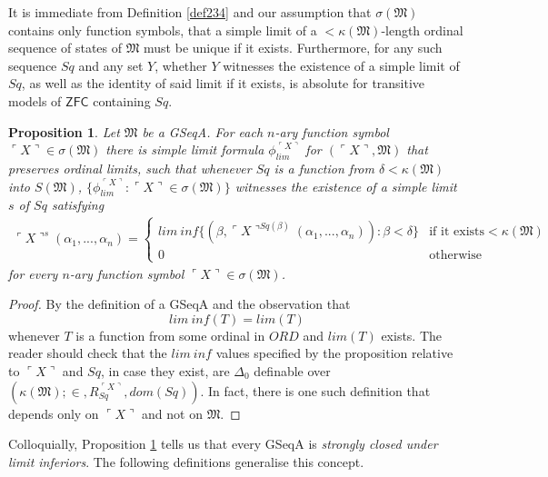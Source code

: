 \documentclass[12pt, twoside]{memoir}
\numberwithin{equation}{section}
\newtheorem{prop}[thm]{Proposition}
\theoremstyle{definition}
\theoremstyle{remark}
\theoremstyle{definition}
\theoremstyle{definition}
\theoremstyle{definition}
\theoremstyle{remark}
\begin{document}
It is immediate from Definition \ref{def234} and our assumption that $\sigma(\mathfrak{M})$ contains only function symbols, that a simple limit of a $< \kappa(\mathfrak{M})$-length ordinal sequence of states of $\mathfrak{M}$ must be unique if it exists. Furthermore, for any such sequence $Sq$ and any set $Y$, whether $Y$ witnesses the existence of a simple limit of $Sq$, as well as the identity of said limit if it exists, is absolute for transitive models of $\mathsf{ZFC}$ containing $Sq$.

\begin{prop}\label{prop233}
Let $\mathfrak{M}$ be a GSeqA. For each $n$-ary function symbol $\ulcorner X \urcorner \in \sigma(\mathfrak{M})$ there is simple limit formula $\phi_{lim}^{\ulcorner X \urcorner}$ for $(\ulcorner X \urcorner, \mathfrak{M})$ that preserves ordinal limits, such that whenever $Sq$ is a function from $\delta < \kappa(\mathfrak{M})$ into $S(\mathfrak{M})$, $\{\phi_{lim}^{\ulcorner X \urcorner} : \ulcorner X \urcorner \in \sigma(\mathfrak{M})\}$ witnesses the existence of a simple limit $s$ of $Sq$ satisfying 
\begin{gather*}
    \ulcorner X \urcorner^{s} (\alpha_1, ..., \alpha_n) = 
    \begin{cases}
        lim \ inf \{(\beta, \ulcorner X \urcorner^{Sq(\beta)}(\alpha_1, ..., \alpha_n)) : \beta < \delta\} & \!\!\!\! \text{if it exists} < \kappa(\mathfrak{M}) \\
        0 & \!\!\!\! \text{otherwise}
    \end{cases} 
\end{gather*}
for every $n$-ary function symbol $\ulcorner X \urcorner \in \sigma(\mathfrak{M})$.
\end{prop}

\begin{proof}
By the definition of a GSeqA and the observation that 
\begin{equation*}
    lim \ inf (T) = lim (T)
\end{equation*}
whenever $T$ is a function from some ordinal in $ORD$ and $lim (T)$ exists. The reader should check that the $lim \ inf$ values specified by the proposition relative to $\ulcorner X \urcorner$ and $Sq$, in case they exist, are $\Delta_0$ definable over $(\kappa(\mathfrak{M}); \in, R_{Sq}^{\ulcorner X \urcorner}, dom(Sq))$. In fact, there is one such definition that depends only on $\ulcorner X \urcorner$ and not on $\mathfrak{M}$.
\end{proof}

Colloquially, Proposition \ref{prop233} tells us that every GSeqA is \emph{strongly closed under limit inferiors}. The following definitions generalise this concept.
\end{document}
